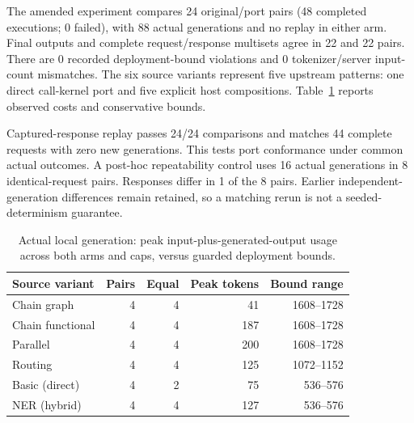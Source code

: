 The amended experiment compares 24 original/port pairs (48 completed executions; 0 failed), with 88 actual generations and no replay in either arm. Final outputs and complete request/response multisets agree in 22 and 22 pairs. There are 0 recorded deployment-bound violations and 0 tokenizer/server input-count mismatches. The six source variants represent five upstream patterns: one direct call-kernel port and five explicit host compositions. Table~\ref{tab:local} reports observed costs and conservative bounds.

Captured-response replay passes 24/24 comparisons and matches 44 complete requests with zero new generations. This tests port conformance under common actual outcomes. A post-hoc repeatability control uses 16 actual generations in 8 identical-request pairs. Responses differ in 1 of the 8 pairs. Earlier independent-generation differences remain retained, so a matching rerun is not a seeded-determinism guarantee.

\begin{table}[!ht]
\centering\small
\begin{tabular}{lrrrr}
\hline
Source variant & Pairs & Equal & Peak tokens & Bound range \\
\hline
Chain graph & 4 & 4 & 41 & 1608--1728 \\
Chain functional & 4 & 4 & 187 & 1608--1728 \\
Parallel & 4 & 4 & 200 & 1608--1728 \\
Routing & 4 & 4 & 125 & 1072--1152 \\
Basic (direct) & 4 & 2 & 75 & 536--576 \\
NER (hybrid) & 4 & 4 & 127 & 536--576 \\
\hline
\end{tabular}
\caption{Actual local generation: peak input-plus-generated-output usage across both arms and caps, versus guarded deployment bounds.}
\label{tab:local}
\end{table}
